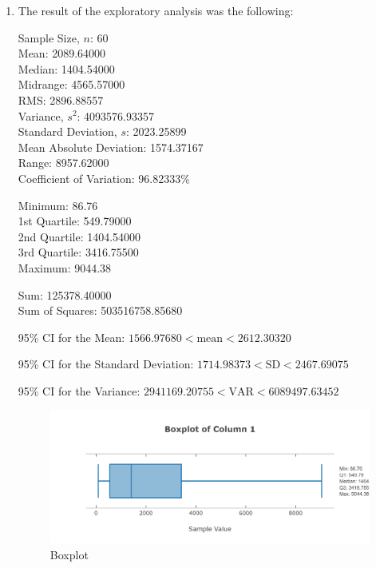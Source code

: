 \documentclass{article}
\begin{document}
\begin{enumerate}[label=(\alph*)]
    \item The result of the exploratory analysis was the following:
          \begin{flushleft}
              Sample Size, $n$: 60 \\
              Mean: 2089.64000 \\
              Median: 1404.54000 \\
              Midrange: 4565.57000 \\
              RMS: 2896.88557 \\
              Variance, $s^2$: 4093576.93357 \\
              Standard Deviation, $s$: 2023.25899 \\
              Mean Absolute Deviation: 1574.37167 \\
              Range: 8957.62000 \\
              Coefficient of Variation: 96.82333\%

              Minimum: 86.76 \\
              1st Quartile: 549.79000 \\
              2nd Quartile: 1404.54000 \\
              3rd Quartile: 3416.75500 \\
              Maximum: 9044.38

              Sum: 125378.40000 \\
              Sum of Squares: 503516758.85680

              95\% CI for the Mean:
              $1566.97680 < \text{mean} < 2612.30320$

              95\% CI for the Standard Deviation:
              $1714.98373 < \text{SD} < 2467.69075$

              95\% CI for the Variance:
              $2941169.20755 < \text{VAR} < 6089497.63452$
          \end{flushleft}

          \begin{figure}[H]
              \centering
              \includegraphics[width=0.8\linewidth]{statdisk_boxplot_q8.png}
              \caption{Boxplot}
              \label{fig:boxplot_q8}
          \end{figure}


\end{enumerate}
\end{document}
